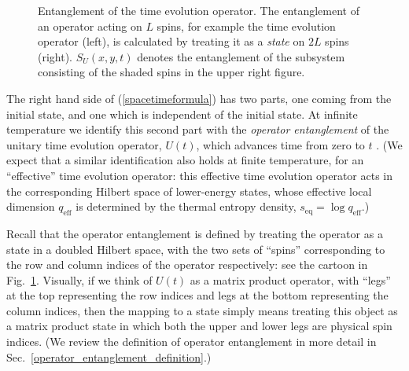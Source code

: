 \documentclass[aps,prx,twocolumn,superscriptaddress,floatfix,nofootinbib,prx]{revtex4}
\renewcommand{\>}{\right\rangle}
\newcommand{\<}{\left\langle}
\newcommand{\seq}{s_\text{eq}}
\begin{document}
\begin{figure}[t]
\caption{
Entanglement of the time evolution operator.  The entanglement of an operator acting on $L$ spins, for example the time evolution operator (left), is calculated by treating it as a  \textit{state} on $2L$ spins  (right). $S_U(x,y,t)$ denotes the entanglement of the subsystem consisting of the shaded spins in the upper right figure. 
}  \label{fig:Uentanglement}
\end{figure}




The right hand side of (\ref{spacetimeformula}) has two parts, one coming from the initial state, and one which is independent of the initial state. At infinite temperature we identify this second part  with the \textit{operator entanglement} of the unitary time evolution operator, $U(t)$, which
advances time from zero to $t$ \cite{zanardi,luitz,dubail}. (We expect that a similar identification also holds at finite temperature, for an ``effective'' time evolution operator: this effective time evolution operator acts in the corresponding Hilbert space of lower-energy states, whose effective local dimension $q_\text{eff}$ is determined by the thermal entropy density, $\seq = \log q_\text{eff}$.)

Recall that the operator entanglement \cite{zanardi,prosenpizorn,prosenpizorn2,luitz,dubail} is defined by treating the operator as a state in a doubled Hilbert space, with the two sets of ``spins'' corresponding to the row and column indices of the operator respectively: see the cartoon in Fig.~\ref{fig:Uentanglement}.   Visually, if we think of $U(t)$ as a matrix product operator, with ``legs'' at the top representing the row indices and legs at the bottom representing the column indices, then the mapping to a state simply means treating this object as a matrix product state in which both the upper and lower legs are  physical spin indices. (We review the definition of operator entanglement in more detail in Sec.~\ref{operator_entanglement_definition}.)
\end{document}
